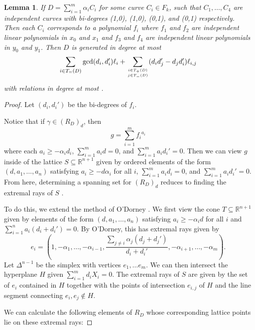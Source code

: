 \documentclass{amsart}
\theoremstyle{plain}
\newtheorem{lem}[thm]{Lemma}
\theoremstyle{definition}
\theoremstyle{remark}
\numberwithin{equation}{section}
\begin{document}
\begin{lem}
If $D=\sum_{i=1}^m \alpha_i C_i$ for some curve $C_i\in F_k$, such that $C_1, \ldots, C_4$ are independent curves with bi-degrees (1,0), (1,0), (0,1), and (0,1) respectively.  Then each $C_i$ corresponds to a polynomial $f_i$ where $f_1$ and $f_2$ are independent linear polynomials in $x_0$ and $x_1$ and $f_3$ and $f_4$ are independent linear polynomials in $y_0$ and $y_1$.  Then $D$ is generated in degree at most
\[
	\sum_{i\in T_=(D)} \gcd(d_i, d_i')\ell_i + \sum_{i\in T_+(D) \atop j\in T_-(D)} (d_i d_j'- d_j d_i')\ell_{i,j}
\]
 with relations in degree at most .
\end{lem}
\begin{proof}
Let $(d_i, d_i')$ be the bi-degrees of $f_i$. 

Notice that if $\gamma \in (R_D)_d$, then 
\[
	g = \sum_{i=1}^m {f_i}^{a_i}
\]
where each $a_i \ge - \alpha_i d_i$, $\sum_{i=1}^m a_i d = 0$, and $\sum_{i=1}^m a_i d_i' = 0$.  Then we can view $g$ inside of the lattice
$S\subseteq \mathbb{R}^{n+1}$ given by ordered elements of the form $(d, a_1, \ldots, a_n)$ satisfying $a_i \ge - d \alpha_i$ for all $i$, $\sum_{i=1}^m a_i d_i = 0$, and $\sum_{i=1}^m a_i d_i' = 0$. 
From here, determining a spanning set for $(R_D)_d$ reduces to finding the extremal rays of $S$ .  

To do this, we extend the method of O'Dorney .  We first view the cone $T\subseteq \mathbb{R}^{n+1}$ given by elements of the form $(d, a_1, \ldots, a_n)$ satisfying $a_i \ge -\alpha_i d$ for all $i$ and $\sum_{i=1}^n a_i (d_i + d_i') =0$.  By O'Dorney, this has extremal rays given by 
\[
	e_i = (1, -\alpha_1, \ldots, -\alpha_{i-1}, \frac{\sum_{j \ne i} \alpha_j(d_j+ d_j')}{d_i + d_i'}, -\alpha_{i+1}, \ldots, - \alpha_m).
\]
Let $\Delta^{n-1}$ be the simplex with vertices $e_1, \ldots e_m$.  We can then intersect the hyperplane $H$ given $\sum_{i=1}^m  d_i X_i = 0$.  The extremal rays of $S$ are given by the set of $e_i$ contained in $H$ together with the points of intersection $e_{i,j}$ of $H$ and the line segment connecting $e_i, e_j \not \in H$.

 We can calculate the following elements of $R_D$ whose corresponding lattice points lie on these extremal rays:


\end{proof}
\end{document}
